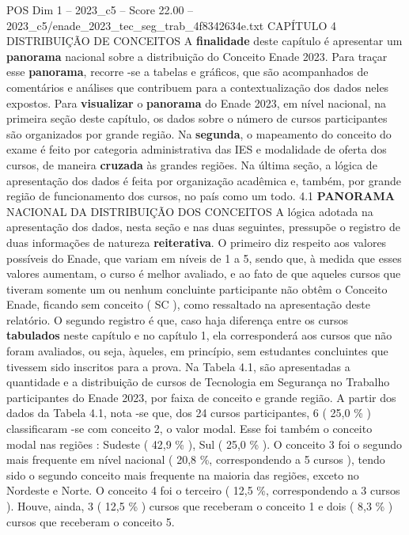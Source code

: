 \begin{textsample}{POS Dim 1 – 2023\_c5 – Score 22.00 – 2023\_c5/enade\_2023\_tec\_seg\_trab\_4f8342634e.txt}  \label{ex:f1_pos_010}
CAPÍTULO 4 DISTRIBUIÇÃO DE CONCEITOS A \textbf{finalidade} deste capítulo é apresentar um \textbf{panorama} nacional sobre a distribuição do Conceito Enade 2023.
Para traçar esse \textbf{panorama}, recorre -se a tabelas e gráficos, que são acompanhados de comentários e análises que contribuem para a contextualização dos dados neles expostos.
Para \textbf{visualizar} o \textbf{panorama} do Enade 2023, em nível nacional, na primeira seção deste capítulo, os dados sobre o número de cursos participantes são organizados por grande região.
Na \textbf{segunda}, o mapeamento do conceito do exame é feito por categoria administrativa das IES e modalidade de oferta dos cursos, de maneira \textbf{cruzada} às grandes regiões.
Na última seção, a lógica de apresentação dos dados é feita por organização acadêmica e, também, por grande região de funcionamento dos cursos, no país como um todo. 4.1 \textbf{PANORAMA} NACIONAL DA DISTRIBUIÇÃO DOS CONCEITOS A lógica adotada na apresentação dos dados, nesta seção e nas duas seguintes, pressupõe o registro de duas informações de natureza \textbf{reiterativa}.
O primeiro diz respeito aos valores possíveis do Enade, que variam em níveis de 1 a 5, sendo que, à medida que esses valores aumentam, o curso é melhor avaliado, e ao fato de que aqueles cursos que tiveram somente um ou nenhum concluinte participante não obtêm o Conceito Enade, ficando sem conceito ( SC ), como ressaltado na apresentação deste relatório.
O segundo registro é que, caso haja diferença entre os cursos \textbf{tabulados} neste capítulo e no capítulo 1, ela corresponderá aos cursos que não foram avaliados, ou seja, àqueles, em princípio, sem estudantes concluintes que tivessem sido inscritos para a prova.
Na Tabela 4.1, são apresentadas a quantidade e a distribuição de cursos de Tecnologia em Segurança no Trabalho participantes do Enade 2023, por faixa de conceito e grande região.
A partir dos dados da Tabela 4.1, nota -se que, dos 24 cursos participantes, 6 ( 25,0 \% ) classificaram -se com conceito 2, o valor modal.
Esse foi também o conceito modal nas regiões : Sudeste ( 42,9 \% ), Sul ( 25,0 \% ).
O conceito 3 foi o segundo mais frequente em nível nacional ( 20,8 \%, correspondendo a 5 cursos ), tendo sido o segundo conceito mais frequente na maioria das regiões, exceto no Nordeste e Norte.
O conceito 4 foi o terceiro ( 12,5 \%, correspondendo a 3 cursos ).
Houve, ainda, 3 ( 12,5 \% ) cursos que receberam o conceito 1 e dois ( 8,3 \% ) cursos que receberam o conceito 5.

\end{textsample}
